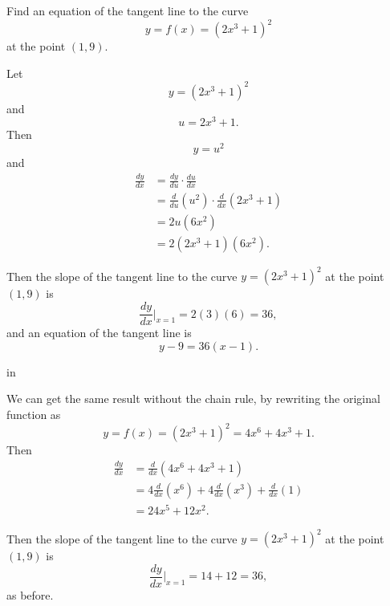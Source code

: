 \documentclass{ximera}
\newcommand{\pskip}{\vskip 0.1 in}
\begin{document}
\begin{example}  \label{Ex:GDFGDFGff}
Find an equation of the tangent line to the curve
\[
  y = f(x) = \left( 2x^3 +1  \right)^2
\]
at the point $(1,9)$.

\begin{explanation}
Let 
\[
       y = \left( 2x^3 +1  \right)^2
\]
and 
\[
      u = 2x^3 + 1 .
\]
Then
\[
     y = u^2
\]
and
\begin{align*}
\frac{dy}{dx} &= \frac{dy}{du} \cdot \frac{du}{dx}  \\
                     &= \frac{d}{du} \left( u^2 \right)  \cdot \frac{d}{dx}\left(  2x^3 + 1 \right)  \\
                     &= 2u (6x^2)  \\
                     &= 2(2x^3+1)(6x^2) .
\end{align*}

Then the slope of the tangent line to the curve $y=(2x^3+1)^2$ at the point $(1,9)$ is 
\[
              \frac{dy}{dx}\Big|_{x=1} = 2(3)(6) = 36 ,
\]
and an equation of the tangent line is
\[
   y - 9 = 36(x-1) .
\]

\pskip 

We can get the same result without the chain rule, by rewriting the original function as
\[
     y = f(x) = (2x^3+1)^2 = 4x^6 + 4x^3 + 1.
\] 
Then
\begin{align*}
      \frac{dy}{dx} &= \frac{d}{dx} \left(  4x^6 + 4x^3 + 1  \right) \\
                         &= 4\frac{d}{dx}\left( x^6 \right) + 4 \frac{d}{dx}\left( x^3 \right) + \frac{d}{dx}\left(1 \right) \\
                        &=   24x^5 + 12x^2 .
\end{align*}

Then the slope of the tangent line to the curve $y=(2x^3+1)^2$ at the point $(1,9)$ is 
\[
              \frac{dy}{dx}\Big|_{x=1} =14 + 12 = 36 ,
\]
as before.

\end{explanation}
\end{example}
\end{document}
